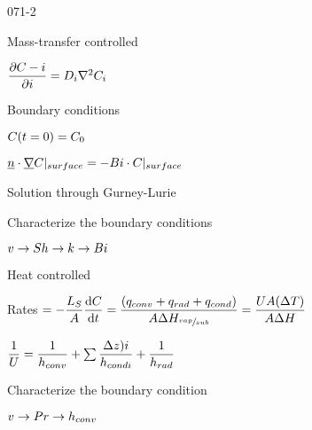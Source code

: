 \begin{mitframe}{071-2}
\begin{listone}
	\item Mass-transfer controlled
    \item $\dfrac{\partial\conc-{\state}}{\partial{\state}}=\pdiff\nabla^2\conc_{\state}$
    \begin{listtwo}
    	\item Boundary conditions
        	\begin{listthree}
            	\item $\conc(t=0)=\conc_0$
                \item $\uline{n}\cdot\gradop\conc|_{surface
                }=-\biot\cdot\conc|_{surface}$
                \item Solution through Gurney-Lurie
            \end{listthree}
    \end{listtwo}
\item Characterize the boundary conditions
		\begin{listtwo}
        	\item $\vvel\rightarrow\sherwood\rightarrow\thermcond\rightarrow\biot$
            
        \end{listtwo}
\item Heat controlled
		\begin{listtwo}
        	\item Rates $=-\dfrac{\length_{\entropy}}{\helmholtz}\dfrac{\mathrm{d}\conc}{\mathrm{d}t}=\dfrac{(\heatflux_{conv}+\heatflux_{rad}+\heatflux_{cond})}{\helmholtz\iipf\enthalpy_{\sfrac{vap}{sub}}}=\dfrac{\uvel\helmholtz(\iipf\Temp)}{\helmholtz\iipf\enthalpy}$
            \begin{listthree}
            \item$\dfrac{1}{\uvel}=\dfrac{1}{\heattranscoeff_{conv}}+\sum\nolimits\dfrac{\iipf{z}){\state}}{\heattranscoeff_{cond\state}}+\dfrac{1}{\heattranscoeff_{rad}}$
            \end{listthree}
        \end{listtwo}
\item Characterize the boundary condition
		\begin{listtwo}
        	\item $\vvel\rightarrow\prandtl\rightarrow\heattranscoeff_{conv}$
        \end{listtwo}
\end{listone}
\end{mitframe}